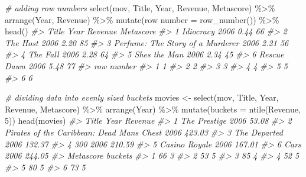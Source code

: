 \documentclass[
]{book}
\newenvironment{Shaded}{\begin{snugshade}}{\end{snugshade}}
\newcommand{\AttributeTok}[1]{\textcolor[rgb]{0.77,0.63,0.00}{#1}}
\newcommand{\CommentTok}[1]{\textcolor[rgb]{0.56,0.35,0.01}{\textit{#1}}}
\newcommand{\DecValTok}[1]{\textcolor[rgb]{0.00,0.00,0.81}{#1}}
\newcommand{\FunctionTok}[1]{\textcolor[rgb]{0.00,0.00,0.00}{#1}}
\newcommand{\NormalTok}[1]{#1}
\newcommand{\OtherTok}[1]{\textcolor[rgb]{0.56,0.35,0.01}{#1}}
\newcommand{\SpecialCharTok}[1]{\textcolor[rgb]{0.00,0.00,0.00}{#1}}
\newcommand{\StringTok}[1]{\textcolor[rgb]{0.31,0.60,0.02}{#1}}
\begin{document}
\begin{Shaded}
\begin{Highlighting}[]
\CommentTok{\# adding row numbers}
\FunctionTok{select}\NormalTok{(mov, Title, Year, Revenue, Metascore) }\SpecialCharTok{\%\textgreater{}\%}
  \FunctionTok{arrange}\NormalTok{(Year, Revenue) }\SpecialCharTok{\%\textgreater{}\%}
  \FunctionTok{mutate}\NormalTok{(}\StringTok{\textasciigrave{}}\AttributeTok{row number}\StringTok{\textasciigrave{}} \OtherTok{=} \FunctionTok{row\_number}\NormalTok{()) }\SpecialCharTok{\%\textgreater{}\%}
  \FunctionTok{head}\NormalTok{()}
\CommentTok{\#\textgreater{}                              Title Year Revenue Metascore}
\CommentTok{\#\textgreater{} 1                        Idiocracy 2006    0.44        66}
\CommentTok{\#\textgreater{} 2                         The Host 2006    2.20        85}
\CommentTok{\#\textgreater{} 3 Perfume: The Story of a Murderer 2006    2.21        56}
\CommentTok{\#\textgreater{} 4                         The Fall 2006    2.28        64}
\CommentTok{\#\textgreater{} 5                    She\textquotesingle{}s the Man 2006    2.34        45}
\CommentTok{\#\textgreater{} 6                      Rescue Dawn 2006    5.48        77}
\CommentTok{\#\textgreater{}   row number}
\CommentTok{\#\textgreater{} 1          1}
\CommentTok{\#\textgreater{} 2          2}
\CommentTok{\#\textgreater{} 3          3}
\CommentTok{\#\textgreater{} 4          4}
\CommentTok{\#\textgreater{} 5          5}
\CommentTok{\#\textgreater{} 6          6}

\CommentTok{\# dividing data into evenly sized buckets}
\NormalTok{movies }\OtherTok{\textless{}{-}}
\FunctionTok{select}\NormalTok{(mov, Title, Year, Revenue, Metascore) }\SpecialCharTok{\%\textgreater{}\%}
  \FunctionTok{arrange}\NormalTok{(Year) }\SpecialCharTok{\%\textgreater{}\%}
  \FunctionTok{mutate}\NormalTok{(}\AttributeTok{buckets =} \FunctionTok{ntile}\NormalTok{(Revenue, }\DecValTok{5}\NormalTok{))}
\FunctionTok{head}\NormalTok{(movies)}
\CommentTok{\#\textgreater{}                                        Title Year Revenue}
\CommentTok{\#\textgreater{} 1                               The Prestige 2006   53.08}
\CommentTok{\#\textgreater{} 2 Pirates of the Caribbean: Dead Man\textquotesingle{}s Chest 2006  423.03}
\CommentTok{\#\textgreater{} 3                               The Departed 2006  132.37}
\CommentTok{\#\textgreater{} 4                                        300 2006  210.59}
\CommentTok{\#\textgreater{} 5                              Casino Royale 2006  167.01}
\CommentTok{\#\textgreater{} 6                                       Cars 2006  244.05}
\CommentTok{\#\textgreater{}   Metascore buckets}
\CommentTok{\#\textgreater{} 1        66       3}
\CommentTok{\#\textgreater{} 2        53       5}
\CommentTok{\#\textgreater{} 3        85       4}
\CommentTok{\#\textgreater{} 4        52       5}
\CommentTok{\#\textgreater{} 5        80       5}
\CommentTok{\#\textgreater{} 6        73       5}


\end{Highlighting}
\end{Shaded}
\end{document}
